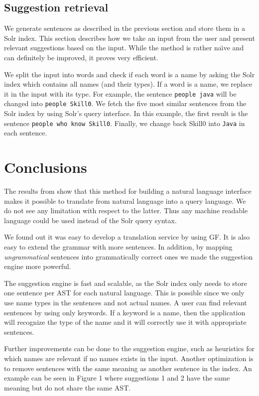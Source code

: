 \documentclass[10pt, a4paper]{article}
\begin{document}
\subsection{Suggestion retrieval}
 We generate sentences as described in the previous section and store them in a Solr index. This section describes how we take an input from the user and present relevant suggestions based on the input. While the method is rather na\"{\i}ve and can definitely be improved, it proves very efficient.

 We split the input into words and check if each word is a name by asking the Solr index which contains all names (and their types). If a word is a name, we replace it in the input with its type. For example, the sentence \texttt{people java} will be changed into \texttt{people Skill0}. We fetch the five most similar sentences from the Solr index by using Solr's query interface. In this example, the first result is the sentence \texttt{people who know Skill0}. Finally, we change back Skill0 into \texttt{Java} in each sentence.

\section{Conclusions}
The results from \cite{agfjord:2014} show that this method for building 
a natural language interface makes it possible to translate from 
natural language into a query language. We do not see any limitation with respect to the latter. Thus any machine readable language could be used instead of  the Solr query syntax.

We found out it was easy to develop a translation service by using GF. 
It is also easy to extend the grammar with more sentences. 
In addition, by mapping \emph{ungrammatical} sentences into 
grammatically correct ones we made the suggestion engine more powerful.

The suggestion engine is fast and scalable, 
as the Solr index only needs to store one sentence per AST for 
each natural language. This is possible since we only use name types in 
the sentences and not actual names. A user can find relevant sentences 
by using only keywords. If a keyword is a name, then the application 
will recognize the type of the name and it will correctly use it 
with appropriate sentences.

Further improvements can be done to 
the suggestion engine, such as heuristics for which names 
are relevant if no names exists in the input. 
Another optimization is to remove sentences with 
the same meaning as another sentence in the index. An example 
can be seen in Figure 1 where suggestions 1 and 2 have the same meaning but do not share the same AST.
\end{document}
